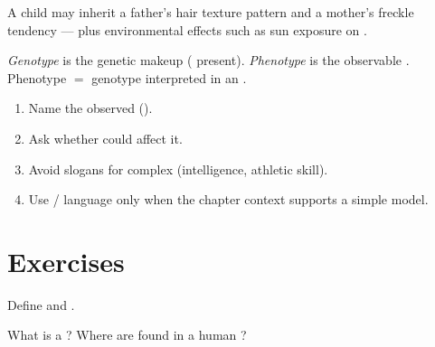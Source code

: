 \begin{example}\label{ex:g7:heredity:family}
A child may inherit a father's hair texture  pattern and a mother's
freckle tendency --- plus environmental effects such as sun exposure on
.
\end{example}

\begin{definition}\label{def:g7:heredity:pheno}
\emph{Genotype} is the genetic makeup ( present).
\emph{Phenotype} is the observable . Phenotype $=$
genotype interpreted in an .
\end{definition}

\begin{method}\label{met:g7:heredity:talk}
\begin{enumerate}
  \item Name the  observed ().
  \item Ask whether  could affect it.
  \item Avoid  slogans for complex  (intelligence, athletic
        skill).
  \item Use / language only when the chapter context
        supports a simple model.
\end{enumerate}
\end{method}

\section{Exercises}

\begin{exercise}[$\star$]\label{exo:g7:heredity:1}
Define  and .
\end{exercise}

\begin{exercise}[$\star$]\label{exo:g7:heredity:2}
What is a ? Where are  found in a human  ?
\end{exercise}


